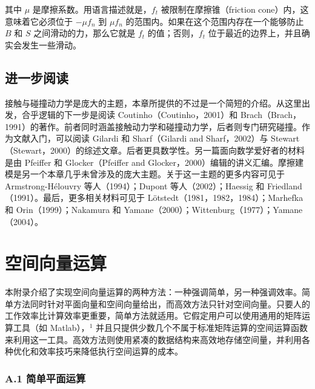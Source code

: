 \documentclass[10pt,a4paper]{book}
\theoremstyle{thmstyle} %
\theoremstyle{defstyle} %
\theoremstyle{prostyle} %
\begin{document}
其中 $\mu$ 是摩擦系数。用语言描述就是，$f_t$ 被限制在摩擦锥（friction cone）内，这意味着它必须位于 $-\mu f_n$ 到 $\mu f_n$ 的范围内。如果在这个范围内存在一个能够防止 $B$ 和 $S$ 之间滑动的力，那么它就是 $f_t$ 的值；否则，$f_t$ 位于最近的边界上，并且确实会发生一些滑动。



\section{进一步阅读}





接触与碰撞动力学是庞大的主题，本章所提供的不过是一个简短的介绍。从这里出发，合乎逻辑的下一步是阅读 Coutinho（Coutinho，2001）和 Brach（Brach，1991）的著作。前者同时涵盖接触动力学和碰撞动力学，后者则专门研究碰撞。作为文献入门，可以阅读 Gilardi 和 Sharf（Gilardi and Sharf，2002）与 Stewart（Stewart，2000）的综述文章。后者更具数学性。另一篇面向数学爱好者的材料是由 Pfeiffer 和 Glocker（Pfeiffer and Glocker，2000）编辑的讲义汇编。摩擦建模是另一个本章几乎未曾涉及的庞大主题。关于这一主题的更多内容可见于 Armstrong-Hélouvry 等人（1994）；Dupont 等人（2002）；Haessig 和 Friedland（1991）。最后，更多相关材料可见于 Lötstedt（1981，1982，1984）；Marhefka 和 Orin（1999）；Nakamura 和 Yamane（2000）；Wittenburg（1977）；Yamane（2004）。



\chapter{空间向量运算}







本附录介绍了实现空间向量运算的两种方法：一种强调简单，另一种强调效率。简单方法同时针对平面向量和空间向量给出，而高效方法只针对空间向量。只要人的工作效率比计算效率更重要，简单方法就适用。它假定用户可以使用通用的矩阵运算工具（如 Matlab），$^{1}$ 并且只提供少数几个不属于标准矩阵运算的空间运算函数来利用这一工具。高效方法则使用紧凑的数据结构来高效地存储空间量，并利用各种优化和效率技巧来降低执行空间运算的成本。



\subsection{A.1 简单平面运算}
\end{document}
